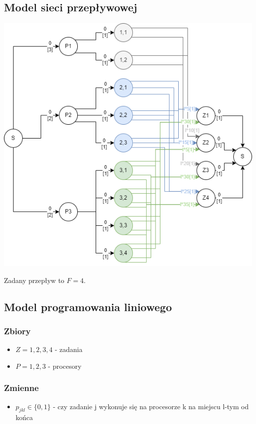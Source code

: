 \documentclass{article}
\begin{document}
\subsection*{Model sieci przepływowej}
\includegraphics[height=0.4\paperheight]{zad4.png}

Zadany przepływ to $F=4$.

\subsection*{Model programowania liniowego}
\subsubsection*{Zbiory}
\begin{itemize}
	\item $Z = {1, 2, 3, 4}$ - zadania
	\item $P = {1, 2, 3}$ - procesory
\end{itemize}

\subsubsection*{Zmienne}
\begin{itemize}
	\item $p_{jkl} \in \{0, 1\}$ - czy zadanie j wykonuje się na procesorze k na miejscu l-tym od końca
\end{itemize}
\end{document}

